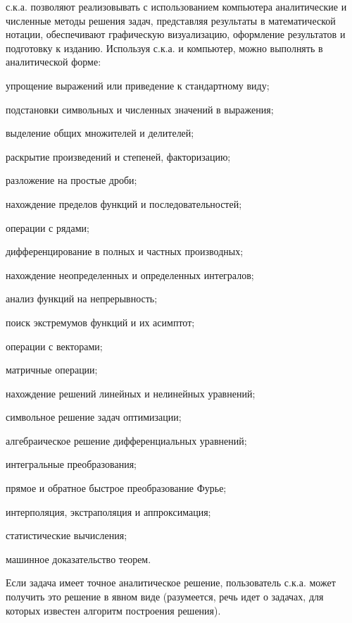 с.к.а. позволяют реализовывать с использованием компьютера аналитические и численные методы решения задач, представляя результаты в математической нотации, обеспечивают графическую визуализацию, оформление результатов и подготовку к изданию. 
Используя с.к.а. и компьютер, можно выполнять в аналитической форме:

\begin{textitemize}
	\item упрощение выражений или приведение к стандартному виду;
	\item подстановки символьных и численных значений в выражения; 
	\item выделение общих множителей и делителей;
	\item раскрытие произведений и степеней, факторизацию;
	\item разложение на простые дроби;
	\item нахождение пределов функций и последовательностей; 
	\item операции с рядами;
	\item дифференцирование в полных и частных производных;
	\item нахождение неопределенных и определенных интегралов;
	\item анализ функций на непрерывность;
	\item поиск экстремумов функций и их асимптот;
	\item операции с векторами;
	\item матричные операции;
	\item нахождение решений линейных и нелинейных уравнений;
	\item символьное решение задач оптимизации;
	\item алгебраическое решение дифференциальных уравнений;
	\item интегральные преобразования;
	\item прямое и обратное быстрое преобразование Фурье;
	\item интерполяция, экстраполяция и аппроксимация;
	\item статистические вычисления;
	\item машинное доказательство теорем.
\end{textitemize}

Если задача имеет точное аналитическое решение, пользователь с.к.а. может получить это решение в явном виде (разумеется, речь идет о задачах, для которых известен алгоритм построения решения).

